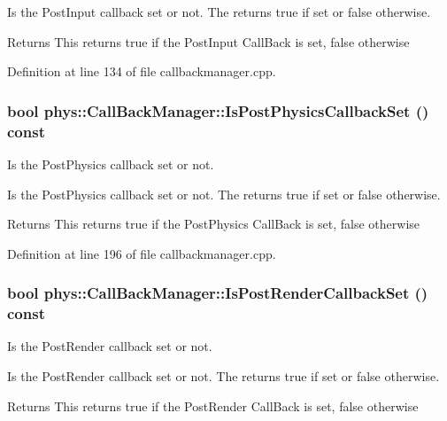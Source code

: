 Is the PostInput callback set or not. The returns true if set or false otherwise. \begin{DoxyReturn}{Returns}
This returns true if the PostInput CallBack is set, false otherwise 
\end{DoxyReturn}


Definition at line 134 of file callbackmanager.cpp.

\hypertarget{classphys_1_1CallBackManager_ad1e2131d792c6813caae4be4d5c4e5fb}{
\subsubsection[{IsPostPhysicsCallbackSet}]{\setlength{\rightskip}{0pt plus 5cm}bool phys::CallBackManager::IsPostPhysicsCallbackSet () const}}
\label{d1/d47/classphys_1_1CallBackManager_ad1e2131d792c6813caae4be4d5c4e5fb}


Is the PostPhysics callback set or not. 

Is the PostPhysics callback set or not. The returns true if set or false otherwise. \begin{DoxyReturn}{Returns}
This returns true if the PostPhysics CallBack is set, false otherwise 
\end{DoxyReturn}


Definition at line 196 of file callbackmanager.cpp.

\hypertarget{classphys_1_1CallBackManager_aab2be377bc741b893e83dc69cadc0f76}{
\subsubsection[{IsPostRenderCallbackSet}]{\setlength{\rightskip}{0pt plus 5cm}bool phys::CallBackManager::IsPostRenderCallbackSet () const}}
\label{d1/d47/classphys_1_1CallBackManager_aab2be377bc741b893e83dc69cadc0f76}


Is the PostRender callback set or not. 

Is the PostRender callback set or not. The returns true if set or false otherwise. \begin{DoxyReturn}{Returns}
This returns true if the PostRender CallBack is set, false otherwise 
\end{DoxyReturn}


